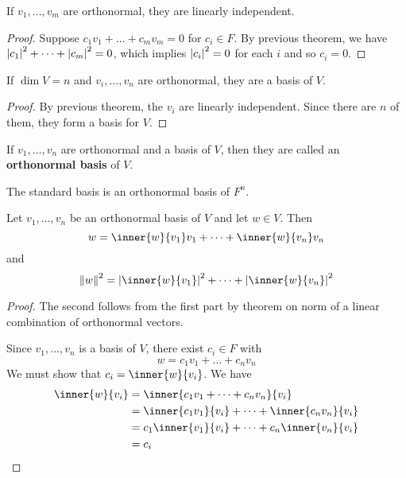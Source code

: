 \documentclass{article}
\begin{document}
\begin{theorem}
  If $v_1, \ldots, v_m$ are orthonormal, they are linearly independent.
\end{theorem}
\begin{proof}
  Suppose $c_1v_1 + \dots +c_mv_m = 0$ for $c_i \in F$. By previous theorem, we have $\abs{c_1}^2 + \dots + \abs{c_m}^2 = 0$, which implies $\abs{c_i}^2 = 0$ for each $i$ and so $c_i = 0$.
\end{proof}
\begin{theorem}
  If $\dim V = n$ and $v_i, \ldots, v_n$ are orthonormal, they are a basis of $V$.
\end{theorem}
\begin{proof}
  By previous theorem, the $v_i$ are linearly independent. Since there are $n$ of them, they form a basis for $V$.
\end{proof}
\begin{definition}
  If $v_1, \ldots, v_n$ are orthonormal and a basis of $V$, then they are called an \textbf{orthonormal basis} of $V$.
\end{definition}
\begin{definition}
  The standard basis is an orthonormal basis of $F^n$.
\end{definition}
\begin{theorem}
  Let $v_1, \ldots, v_n$ be an orthonormal basis of $V$ and let $w \in V$. Then \[
    w = \inner{w}{v_1}v_1 + \dots + \inner{w}{v_n}v_n
  \] and \[
    \norm{w}^2 = \abs{\inner{w}{v_1}}^2 + \dots + \abs{\inner{w}{v_n}}^2
  \]
\end{theorem}
\begin{proof}
  The second follows from the first part by theorem on norm of a linear combination of orthonormal vectors.

  Since $v_1, \ldots, v_n$ is a basis of $V$, there exist $c_i \in F$ with
  \[
    w = c_1v_1 + \dots + c_nv_n
  \]
  We must show that $c_i = \inner{w}{v_i}$. We have
  \begin{align*}
    \inner{w}{v_i} & = \inner{c_1v_1 + \dots + c_nv_n}{v_i}              \\
                   & = \inner{c_1v_1}{v_i} + \dots + \inner{c_nv_n}{v_i} \\
                   & = c_1\inner{v_1}{v_i} + \dots + c_n\inner{v_n}{v_i} \\
                   & = c_i
  \end{align*}
\end{proof}
\end{document}
